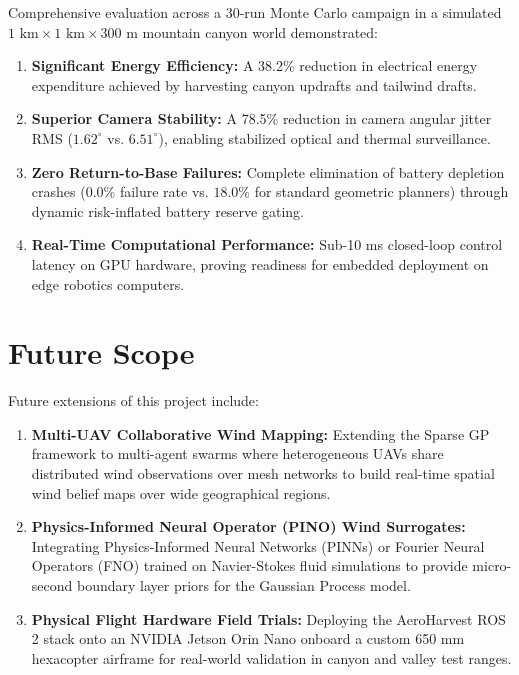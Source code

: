 \documentclass[12pt,a4paper,oneside]{report}
\begin{document}
Comprehensive evaluation across a 30-run Monte Carlo campaign in a simulated $1\text{ km} \times 1\text{ km} \times 300\text{ m}$ mountain canyon world demonstrated:
\begin{enumerate}
    \item \textbf{Significant Energy Efficiency:} A 38.2\% reduction in electrical energy expenditure achieved by harvesting canyon updrafts and tailwind drafts.
    \item \textbf{Superior Camera Stability:} A 78.5\% reduction in camera angular jitter RMS ($1.62^\circ$ vs. $6.51^\circ$), enabling stabilized optical and thermal surveillance.
    \item \textbf{Zero Return-to-Base Failures:} Complete elimination of battery depletion crashes ($0.0\%$ failure rate vs. $18.0\%$ for standard geometric planners) through dynamic risk-inflated battery reserve gating.
    \item \textbf{Real-Time Computational Performance:} Sub-10 ms closed-loop control latency on GPU hardware, proving readiness for embedded deployment on edge robotics computers.
\end{enumerate}

\section{Future Scope}
Future extensions of this project include:
\begin{enumerate}
    \item \textbf{Multi-UAV Collaborative Wind Mapping:} Extending the Sparse GP framework to multi-agent swarms where heterogeneous UAVs share distributed wind observations over mesh networks to build real-time spatial wind belief maps over wide geographical regions.
    \item \textbf{Physics-Informed Neural Operator (PINO) Wind Surrogates:} Integrating Physics-Informed Neural Networks (PINNs) or Fourier Neural Operators (FNO) trained on Navier-Stokes fluid simulations to provide micro-second boundary layer priors for the Gaussian Process model.
    \item \textbf{Physical Flight Hardware Field Trials:} Deploying the AeroHarvest ROS 2 stack onto an NVIDIA Jetson Orin Nano onboard a custom 650 mm hexacopter airframe for real-world validation in canyon and valley test ranges.
\end{enumerate}
\end{document}
